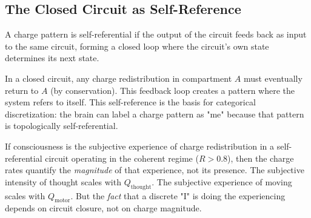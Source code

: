 \subsection{The Closed Circuit as Self-Reference}

\begin{definition}
A charge pattern is self-referential if the output of the circuit feeds back as input to the same circuit, forming a closed loop where the circuit's own state determines its next state.
\end{definition}

In a closed circuit, any charge redistribution in compartment $A$ must eventually return to $A$ (by conservation). This feedback loop creates a pattern where the system refers to itself. This self-reference is the basis for categorical discretization: the brain can label a charge pattern as "me" because that pattern is topologically self-referential.

\begin{remark}
If consciousness is the subjective experience of charge redistribution in a self-referential circuit operating in the coherent regime ($R > 0.8$), then the charge rates quantify the \emph{magnitude} of that experience, not its presence. The subjective intensity of thought scales with $Q_{\text{thought}}$. The subjective experience of moving scales with $Q_{\text{motor}}$. But the \emph{fact} that a discrete "I" is doing the experiencing depends on circuit closure, not on charge magnitude.
\end{remark}